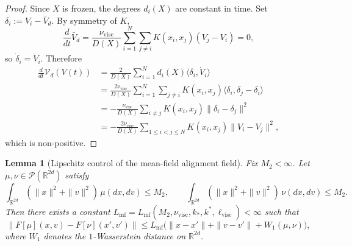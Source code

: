 \documentclass[11pt]{article}
\newtheorem{lemma}[theorem]{Lemma}
\theoremstyle{definition}
\theoremstyle{remark}
\newcommand{\R}{\mathbb{R}}
\newcommand{\mcP}{\mathcal{P}}
\begin{document}
\begin{proof}
Since $X$ is frozen, the degrees $d_i(X)$ are constant in time. Set
$\delta_i:=V_i-\bar V_d$. By symmetry of $K$,
\[
\frac{d}{dt}\bar V_d
=
\frac{\nu_{\mathrm{visc}}}{D(X)}
\sum_{i=1}^N\sum_{j\neq i}K(x_i,x_j)(V_j-V_i)
=0,
\]
so $\dot\delta_i=\dot V_i$. Therefore
\begin{align*}
\frac{d}{dt}\mathscr V_d(V(t))
&=
\frac{2}{D(X)}\sum_{i=1}^Nd_i(X)\langle \delta_i,\dot V_i\rangle\\
&=
\frac{2\nu_{\mathrm{visc}}}{D(X)}
\sum_{i=1}^N\sum_{j\neq i}K(x_i,x_j)\langle \delta_i,\delta_j-\delta_i\rangle\\
&=
-\frac{\nu_{\mathrm{visc}}}{D(X)}
\sum_{i\neq j}K(x_i,x_j)\|\delta_i-\delta_j\|^2\\
&=
-\frac{2\nu_{\mathrm{visc}}}{D(X)}
\sum_{1\leq i<j\leq N}K(x_i,x_j)\|V_i-V_j\|^2,
\end{align*}
which is non-positive.
\end{proof}

\begin{lemma}[Lipschitz control of the mean-field alignment field]\label{lem:mf-lipschitz}
Fix \(M_2<\infty\). Let \(\mu,\nu\in\mcP(\R^{2d})\) satisfy
\[
\int_{\R^{2d}}(\|x\|^2+\|v\|^2)\,\mu(dx,dv)\le M_2,
\qquad
\int_{\R^{2d}}(\|x\|^2+\|v\|^2)\,\nu(dx,dv)\le M_2.
\]
Then there exists a constant
\(L_{\mathrm{mf}}=L_{\mathrm{mf}}(M_2,\nu_{\mathrm{visc}},k_*,k^*,\ell_{\mathrm{visc}})<\infty\)
such that
\[
\|F[\mu](x,v)-F[\nu](x',v')\|
\leq
L_{\mathrm{mf}}
\bigl(\|x-x'\|+\|v-v'\|+W_1(\mu,\nu)\bigr),
\]
where $W_1$ denotes the $1$-Wasserstein distance on $\R^{2d}$.
\end{lemma}
\end{document}
